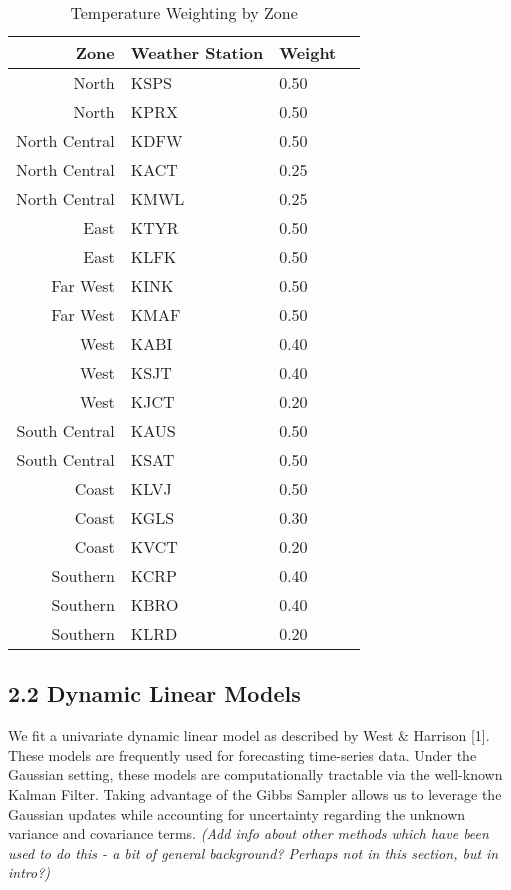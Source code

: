 \documentclass{article}
\begin{document}
\begin{table}[ht]
	\caption{Temperature Weighting by Zone}
\centering
\begin{tabular}{rllr}
  \hline
  Zone & Weather Station & Weight \\ 
  \hline
  North & KSPS & 0.50 \\ 
   North & KPRX & 0.50 \\ 
   North Central & KDFW & 0.50 \\ 
   North Central & KACT & 0.25 \\ 
   North Central & KMWL & 0.25 \\ 
   East & KTYR & 0.50 \\ 
   East & KLFK & 0.50 \\ 
   Far West & KINK & 0.50 \\ 
   Far West & KMAF & 0.50 \\ 
   West & KABI & 0.40 \\ 
   West & KSJT & 0.40 \\ 
   West & KJCT & 0.20 \\ 
   South Central & KAUS & 0.50 \\ 
   South Central & KSAT & 0.50 \\ 
   Coast & KLVJ & 0.50 \\ 
   Coast & KGLS & 0.30 \\ 
   Coast & KVCT & 0.20 \\ 
   Southern & KCRP & 0.40 \\ 
   Southern & KBRO & 0.40 \\ 
   Southern & KLRD & 0.20 \\ 
   \hline
\end{tabular}
\end{table}

\subsection{2.2 Dynamic Linear Models}
We fit a univariate dynamic linear model as described by West \& Harrison [1]. These models are frequently used for forecasting time-series data. Under the Gaussian setting, these models are computationally tractable via the well-known Kalman Filter.  Taking advantage of the Gibbs Sampler allows us to leverage the Gaussian updates while accounting for uncertainty regarding the unknown variance and covariance terms.  \emph{(Add info about other methods which have been used to do this - a bit of general background?  Perhaps not in this section, but in intro?)}
\end{document}
